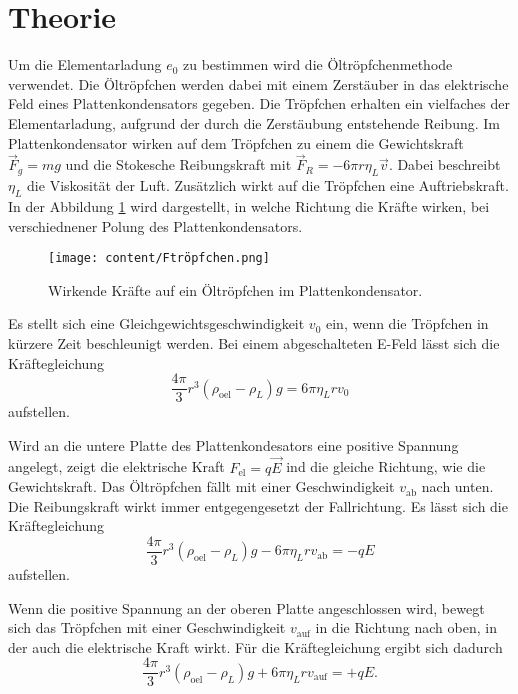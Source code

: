 \section{Theorie}
\label{sec:Theorie}
Um die Elementarladung $e_0$ zu bestimmen wird die Öltröpfchenmethode verwendet.
Die Öltröpfchen werden dabei mit einem Zerstäuber in das elektrische Feld eines Plattenkondensators gegeben.
Die Tröpfchen erhalten ein vielfaches der Elementarladung, aufgrund der durch die Zerstäubung entstehende Reibung.
Im Plattenkondensator wirken auf dem Tröpfchen zu einem die Gewichtskraft $\vec{F}_g = mg$ und die Stokesche Reibungskraft mit
$\vec{F}_R = -6 \pi r \eta_L \vec{v}$.
Dabei beschreibt $\eta_L$ die Viskosität der Luft.
Zusätzlich wirkt auf die Tröpfchen eine Auftriebskraft.
In der Abbildung \ref{fig:Ftröpfchen} wird dargestellt, in welche Richtung die Kräfte wirken, bei verschiednener Polung des Plattenkondensators.

\begin{figure}[H]
    \centering
    \texttt{[image: content/Ftröpfchen.png]}
    \caption{Wirkende Kräfte auf ein Öltröpfchen im Plattenkondensator.}
    \label{fig:Ftröpfchen}
\end{figure}

\noindent Es stellt sich eine Gleichgewichtsgeschwindigkeit $v_0$ ein, wenn die Tröpfchen in kürzere Zeit beschleunigt werden.
Bei einem abgeschalteten E-Feld lässt sich die Kräftegleichung 
\begin{equation}
    \label{Faus}
    \frac{4 \pi}{3} r^3 (\rho_\text{oel} - \rho_L) g = 6 \pi \eta_L r v_0
\end{equation}
aufstellen.

\noindent Wird an die untere Platte des Plattenkondesators eine positive Spannung angelegt, zeigt die elektrische Kraft $F_\text{el} = q \vec{E}$ ind die gleiche Richtung, wie die Gewichtskraft.
Das Öltröpfchen fällt mit einer Geschwindigkeit $v_\text{ab}$ nach unten. 
Die Reibungskraft wirkt immer entgegengesetzt der Fallrichtung.
Es lässt sich die Kräftegleichung
\begin{equation}
    \label{eq:Fvab}
    \frac{4 \pi}{3} r^3 (\rho_\text{oel} - \rho_L) g - 6 \pi \eta_L r v_\text{ab}= -q E
\end{equation}
aufstellen.

\noindent Wenn die positive Spannung an der oberen Platte angeschlossen wird, bewegt sich das Tröpfchen  mit einer Geschwindigkeit $v_\text{auf}$ in die Richtung nach oben,
in der auch die elektrische Kraft wirkt.
Für die Kräftegleichung ergibt sich dadurch
\begin{equation}
    \label{eq:Fvauf}
    \frac{4 \pi}{3} r^3 (\rho_\text{oel} - \rho_L) g + 6 \pi \eta_L r v_\text{auf}= +q E.
\end{equation}

